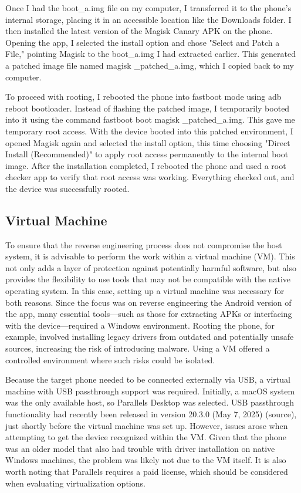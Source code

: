 Once I had the boot\_a.img file on my computer, I transferred it to the phone’s internal storage, placing it in an accessible location like the Downloads folder. I then installed the latest version of the Magisk Canary APK on the phone. Opening the app, I selected the install option and chose "Select and Patch a File," pointing Magisk to the boot\_a.img I had extracted earlier. This generated a patched image file named magisk \_patched\_a.img, which I copied back to my computer.

To proceed with rooting, I rebooted the phone into fastboot mode using adb reboot bootloader. Instead of flashing the patched image, I temporarily booted into it using the command fastboot boot magisk \_patched\_a.img. This gave me temporary root access. With the device booted into this patched environment, I opened Magisk again and selected the install option, this time choosing "Direct Install (Recommended)" to apply root access permanently to the internal boot image.
After the installation completed, I rebooted the phone and used a root checker app to verify that root access was working. Everything checked out, and the device was successfully rooted.

\subsection{Virtual Machine}
To ensure that the reverse engineering process does not compromise the host system, it is advisable to perform the work within a virtual machine (VM). This not only adds a layer of protection against potentially harmful software, but also provides the flexibility to use tools that may not be compatible with the native operating system. In this case, setting up a virtual machine was necessary for both reasons.
Since the focus was on reverse engineering the Android version of the app, many essential tools—such as those for extracting APKs or interfacing with the device—required a Windows environment. Rooting the phone, for example, involved installing legacy drivers from outdated and potentially unsafe sources, increasing the risk of introducing malware. Using a VM offered a controlled environment where such risks could be isolated.

Because the target phone needed to be connected externally via USB, a virtual machine with USB passthrough support was required. Initially, a macOS system was the only available host, so Parallels Desktop was selected. USB passthrough functionality had recently been released in version 20.3.0 (May 7, 2025) (source), just shortly before the virtual machine was set up. However, issues arose when attempting to get the device recognized within the VM. Given that the phone was an older model that also had trouble with driver installation on native Windows machines, the problem was likely not due to the VM itself. It is also worth noting that Parallels requires a paid license, which should be considered when evaluating virtualization options.

